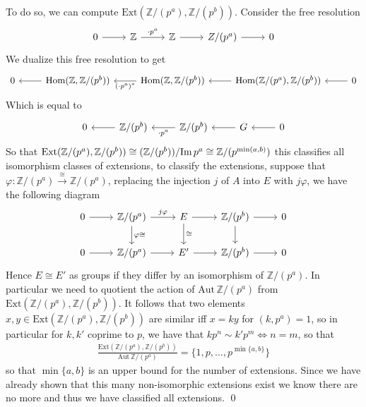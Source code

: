 \documentclass[11pt]{article}
\theoremstyle{definition}
\newcommand{\set}[1]{\{#1\}}
\newcommand{\im}{\text{Im\,}}
\newcommand{\homo}{\text{Hom}}
\newcommand{\ext}{\text{Ext}}
\begin{document}
    To do so, we can compute \(\ext(\mathbb{Z}/(p^a),\mathbb{Z}/(p^b))\). Consider the free resolution
    \begin{equation*}
        \begin{tikzcd}
            0 \arrow[r,"{}"] &\mathbb{Z} \arrow[r,"{\cdot p^a}"] &\mathbb{Z} \arrow[r,"{}"] & Z/(p^a) \arrow[r,"{}"] & 0
        \end{tikzcd}
    \end{equation*}
    We dualize this free resolution to get
    \begin{equation*}
        \begin{tikzcd}
            0 & \homo(\mathbb{Z},\mathbb{Z}/(p^b)) \arrow[l,"{}"] & \homo(\mathbb{Z},\mathbb{Z}/(p^b)) \arrow[l,"{(\cdot p^a)^*}"] & \homo(\mathbb{Z}/(p^a),\mathbb{Z}/(p^b)) \arrow[l,"{}"] & 0 \arrow[l,"{}"]
        \end{tikzcd}
    \end{equation*}
    Which is equal to
    \begin{equation*}
        \begin{tikzcd}
            0 & \mathbb{Z}/(p^b) \arrow[l,"{}"] & \mathbb{Z}/(p^b) \arrow[l,"{\cdot p^a}"] & G \arrow[l,"{}"] & 0 \arrow[l,"{}"]
        \end{tikzcd}
    \end{equation*}
    So that \(\ext(\mathbb{Z}/(p^a),\mathbb{Z}/(p^b)) \cong (\mathbb{Z}/(p^b))/\im p^a \cong \mathbb{Z}/(p^{\min(a,b)})\) this classifies all isomorphism classes of extensions, to classify the extensions, suppose that \(\varphi : \mathbb{Z}/(p^a) \overset{\cong}{\to} \mathbb{Z}/(p^a)\), replacing the injection \(j\) of \(A\) into \(E\) with \(j \varphi\), we have the following diagram
    \begin{equation*}
        \begin{tikzcd}
            0 \arrow[r,"{}"] &\mathbb{Z}/(p^a) \arrow[r,"{j \varphi}"] \arrow[d,"{\varphi \cong}"] & E \arrow[r,"{}"] \arrow[d,"{\cong}"] & \mathbb{Z}/(p^b) \arrow[r,"{}"] \arrow[d,"{}"] & 0 \\
            0 \arrow[r,"{}"]& \mathbb{Z}/(p^a) \arrow[r,"{}"] & E' \arrow[r,"{}"] & \mathbb{Z}/(p^b) \arrow[r,"{}"] & 0
        \end{tikzcd}
    \end{equation*}
    Hence \(E \cong E'\) as groups if they differ by an isomorphism of \(\mathbb{Z}/(p^a)\). In particular we need to quotient the action of \(\text{Aut}\,\mathbb{Z}/(p^a)\) from \(\ext(\mathbb{Z}/(p^a),\mathbb{Z}/(p^b))\). It follows that two elements \(x,y \in \ext(\mathbb{Z}/(p^a),\mathbb{Z}/(p^b))\) are similar iff \(x = ky\) for \((k,p^a) = 1\), so in particular for \(k,k'\) coprime to \(p\), we have that \(kp^n \sim k'p^m \iff n = m\), so that
    \begin{align*}
       \frac{\ext(\mathbb{Z}/(p^a),\mathbb{Z}/(p^b))}{\text{Aut}\,\mathbb{Z}/(p^a)} = \set{1,p,\hdots,p^{\min\set{a,b}}}
    \end{align*}
    so that \(\min\set{a,b}\) is an upper bound for the number of extensions. Since we have already shown that this many non-isomorphic extensions exist we know there are no more and thus we have classified all extensions. \qed
\end{document}
